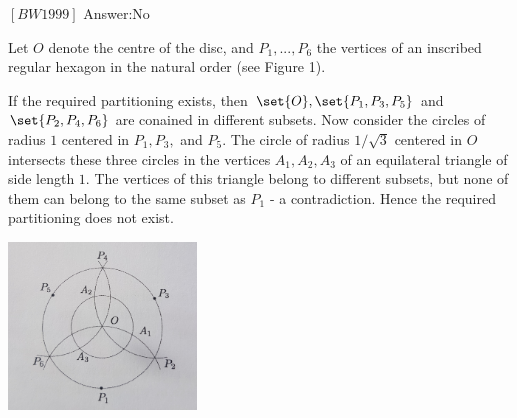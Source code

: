 \begin{problem}
$[BW1999]$
Answer:No

Let $O$ denote the centre of the disc, and $P_1, ... , P_6$ the vertices of an inscribed regular hexagon in the natural order (see Figure 1).

If the required partitioning exists, then $\set{O}, \set{P_1, P_3, P_5}$  and $\set{P_2,P_4, P_6}$ are conained in different subsets. Now consider the circles of radius $1$ centered in $P_1, P_3,$ and $P_5$. The circle of radius $1/\sqrt{3}$ centered in $O$ intersects these three circles in the vertices $A_1, A_2, A_3$ of an equilateral triangle of side length $1$. The vertices of this triangle belong to different subsets, but none of them can belong to the same subset as $P_1$ - a contradiction. Hence the required partitioning does not exist.
\begin{center}
\includegraphics[width=5cm]{Fig1.jpg}
\label{fig:Figure1}
\end{center}
\end{problem}



